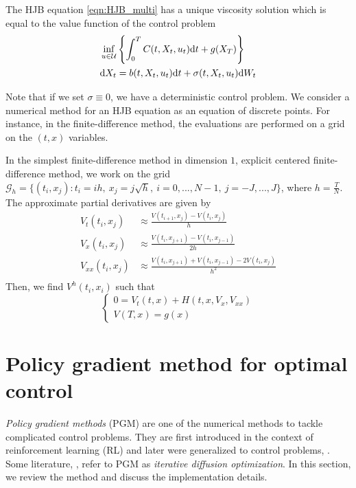 \documentclass[11pt]{book}
\newcommand{\dt}{\text{\normalfont d}t}
\newcommand{\dX}{\text{\normalfont d}X}
\newcommand{\dW}{\text{\normalfont d}W}
\begin{document}
\begin{assp}
    The HJB equation \eqref{eqn:HJB_multi} has a unique viscosity solution which is equal to the value function of the control problem 
    \[
    \begin{split}
    &\inf_{u\in\mathcal{U}}\left\{\int_0^TC(t,X_t,u_t)\dt+g(X_T)\right\}\\
        &\dX_t = b(t,X_t,u_t)\dt+\sigma(t,X_t,u_t)\dW_t
    \end{split}
    \]
    \end{assp}
    Note that if we set $\sigma\equiv0$, we have a deterministic control problem. 
    We consider a numerical method for an HJB equation as an equation of discrete points. For instance, in the finite-difference method, the evaluations are performed on a grid on the $(t,x)$ variables. 
    \begin{eg}
        In the simplest finite-difference method in dimension $1$, explicit centered finite-difference method, we work on the grid $\mathcal{G}_h=\{(t_i,x_j):t_i=ih,~x_j=j\sqrt{h}, ~i=0,...,N-1,~j=-J,...,J\}$, where $h=\frac{T}{N}$. The approximate partial derivatives are given by
        \[
        \begin{split}
        V_t(t_i,x_j)&\approx\frac{V(t_{i+1},x_j)-V(t_{i},x_j)}{h}\\
        V_x(t_i,x_j)&\approx\frac{V(t_{i},x_{j+1})-V(t_{i},x_{j-1})}{2h}\\
        V_{xx}(t_i,x_j)&\approx\frac{V(t_{i},x_{j+1})+V(t_{i},x_{j-1})-2V(t_{i},x_{j})}{h^2}\\
        \end{split}
        \]
       Then, we find $V^h(t_i,x_i)$ such that
       \[
       \begin{cases}
    0= V_t(t,x) + H(t,x,V_x,V_{xx})\\
    V(T,x)=g(x)
\end{cases}
       \]
    \end{eg}
\section{Policy gradient method for optimal control}
\emph{Policy gradient methods} (PGM) are one of the numerical methods to tackle complicated control problems. They are first introduced in the context of reinforcement learning (RL) and later were generalized to control problems, \citet{Powell19}. Some literature, \citet{NR21}, refer to PGM as \emph{iterative diffusion optimization}. In this section, we review the method and discuss the implementation details. 
\end{document}
